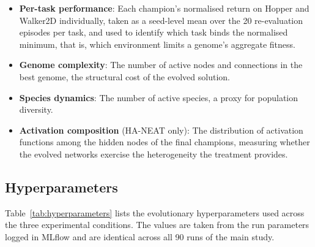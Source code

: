 \documentclass[12pt]{article}
\begin{document}
\begin{itemize}
    \item \textbf{Per-task performance}: Each champion's normalised return on Hopper and Walker2D individually, taken as a seed-level mean over the 20 re-evaluation episodes per task, and used to identify which task binds the normalised minimum, that is, which environment limits a genome's aggregate fitness.
    \item \textbf{Genome complexity}: The number of active nodes and connections in the best genome, the structural cost of the evolved solution.
    \item \textbf{Species dynamics}: The number of active species, a proxy for population diversity.
    \item \textbf{Activation composition} (HA-NEAT only): The distribution of activation functions among the hidden nodes of the final champions, measuring whether the evolved networks exercise the heterogeneity the treatment provides.
\end{itemize}

\subsection{Hyperparameters}
\label{subsec:hyperparameters}

Table~\ref{tab:hyperparameters} lists the evolutionary hyperparameters used across the three experimental conditions.
The values are taken from the run parameters logged in MLflow and are identical across all 90 runs of the main study.
\end{document}

